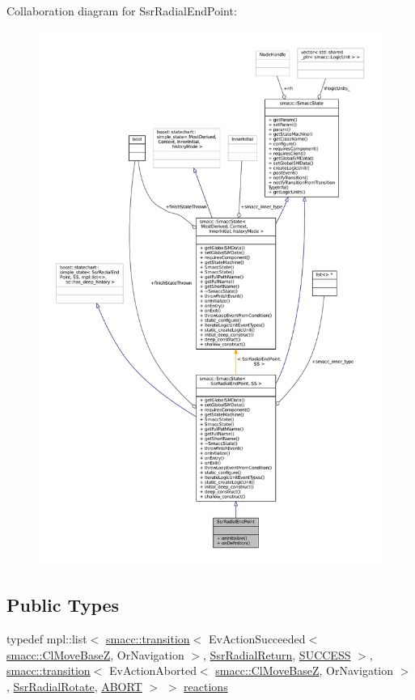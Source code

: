 Collaboration diagram for Ssr\+Radial\+End\+Point\+:
\nopagebreak
\begin{figure}[H]
\begin{center}
\leavevmode
\includegraphics[width=350pt]{structSsrRadialEndPoint__coll__graph}
\end{center}
\end{figure}
\subsection*{Public Types}
\begin{DoxyCompactItemize}
\item 
typedef mpl\+::list$<$ \hyperlink{classsmacc_1_1transition}{smacc\+::transition}$<$ Ev\+Action\+Succeeded$<$ \hyperlink{classsmacc_1_1ClMoveBaseZ}{smacc\+::\+Cl\+Move\+BaseZ}, Or\+Navigation $>$, \hyperlink{structSsrRadialReturn}{Ssr\+Radial\+Return}, \hyperlink{classSUCCESS}{S\+U\+C\+C\+E\+SS} $>$, \hyperlink{classsmacc_1_1transition}{smacc\+::transition}$<$ Ev\+Action\+Aborted$<$ \hyperlink{classsmacc_1_1ClMoveBaseZ}{smacc\+::\+Cl\+Move\+BaseZ}, Or\+Navigation $>$, \hyperlink{structSsrRadialRotate}{Ssr\+Radial\+Rotate}, \hyperlink{classABORT}{A\+B\+O\+RT} $>$ $>$ \hyperlink{structSsrRadialEndPoint_ae5df9b6ac600ded3e01032e784941959}{reactions}
\end{DoxyCompactItemize}
